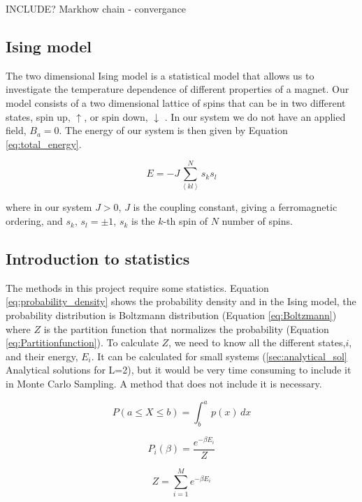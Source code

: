 INCLUDE?
Markhow chain - convergance


\subsection{Ising model}

The two dimensional Ising model is a statistical model that allows us to investigate the temperature dependence of different properties of a magnet. Our model consists of a two dimensional lattice of spins that can be in two different states, spin up, $\uparrow$, or spin down, $\downarrow$ \cite{Ising}. In our system we do not have an applied field, $B_a = 0$. The energy of our system is then given by Equation \ref{eq:total_energy}.

\begin{equation}\label{eq:total_energy}
E = - J \sum^N_{\left< kl \right>} s_k s_l
\end{equation}

where in our system $J > 0$, $J$ is the coupling constant, giving a ferromagnetic ordering, and $s_k, \, s_l = \pm 1$, $s_k$ is the $k$-th spin of $N$ number of spins.

\subsection{Introduction to statistics}

The methods in this project require some statistics. Equation \ref{eq:probability_density} shows the probability density and in the Ising model, the probability distribution is Boltzmann distribution (Equation \ref{eq:Boltzmann}) where $Z$ is the partition function that normalizes the probability (Equation \ref{eq:Partitionfunction}). To calculate $Z$, we need to know all the different states,$i$, and their energy, $E_i$. It can be calculated for small systems (\ref{sec:analytical_sol} Analytical solutions for L=2), but it would be very time consuming to include it in Monte Carlo Sampling. A method that does not include it is necessary.

\begin{equation}\label{eq:probability_density}
P(a\leq X \leq b) = \int_b^a\, p(x)\, dx
\end{equation}

\begin{equation}\label{eq:Boltzmann}
P_i(\beta) = \frac{e^{-\beta E_i}}{Z}
\end{equation}

\begin{equation}\label{eq:Partitionfunction}
Z = \sum_{i=1}^M e^{-\beta E_i}
\end{equation}

